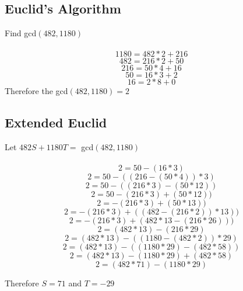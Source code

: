 \documentclass{article}
\begin{document}
\subsection{Euclid's Algorithm}
Find gcd$(482,1180)$
\\\\
$$1180 = 482 * 2 + 216$$
$$482 = 216 * 2 + 50$$
$$216 = 50 * 4 + 16$$
$$50 = 16 * 3 + 2$$
$$16 = 2 * 8 + 0$$
Therefore the gcd$(482,1180) = 2$

\subsection{Extended Euclid}
Let $482S + 1180T =$ gcd$(482,1180)$
\\\\
$$2 = 50 - (16 * 3)$$
$$2 = 50 - ((216 - (50*4)) * 3)$$
$$2 = 50 - ((216*3) - (50*12))$$
$$2 = 50 - (216*3) + (50*12))$$
$$2 = -(216*3) + (50*13))$$
$$2 = -(216*3) + ((482-(216*2))*13))$$
$$2 = -(216*3) + (482*13-(216*26)))$$
$$2 = (482*13)-(216*29)$$
$$2 = (482*13)-((1180 - (482*2))*29)$$
$$2 = (482*13)-((1180*29) - (482*58))$$
$$2 = (482*13)-(1180*29) + (482*58)$$
$$2 = (482*71)-(1180*29)$$

Therefore $S = 71$ and $T=-29$
\end{document}
